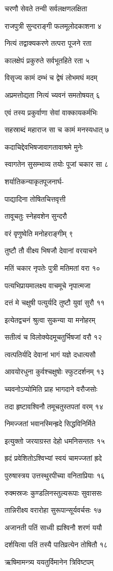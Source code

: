 चरणौ सेवते तन्वी सर्वलक्षणलक्षिता

राजपुत्री सुन्दराङ्गी फलमूलोदकाशना ४

नित्यं तद्वाक्यकरणे तत्परा पूजने रता

कालक्षेपं प्रकुरुते सर्वभूतहिते रता ५

विसृज्य कामं दम्भं च द्वेषं लोभमघं मदम्

अप्रमत्तोद्यता नित्यं च्यवनं समतोषयत् ६

एवं तस्य प्रकुर्वाणा सेवां वाक्कायकर्मभिः

सहस्राब्दं महाराज सा च कामं मनस्यधात् ७

कदाचिद्देवभिषजावागतावाश्रमे मुनेः

स्वागतेन सुसम्भाव्य तयोः पूजां चकार सा ८

शर्यातिकन्याकृतपूजनार्घ-

पाद्यादिना तोषितचित्तवृत्ती

तावूचतुः स्नेहवशेन सुन्दरौ

वरं वृणुष्वेति मनोहराङ्गीम् ९

तुष्टौ तौ वीक्ष्य भिषजौ देवानां वरयाचने

मतिं चकार नृपतेः पुत्री मतिमतां वरा १०

पत्यभिप्रायमालक्ष्य वाचमूचे नृपात्मजा

दत्तं मे चक्षुषी पत्युर्यदि तुष्टौ युवां सुरौ ११

इत्येतद्वचनं श्रुत्वा सुकन्या या मनोहरम्

सतीत्वं च विलोक्येदमूचतुर्भिषजां वरौ १२

त्वत्पतिर्यदि देवानां भागं यज्ञे दधात्यसौ

आवयोरधुना कुर्वश्चक्षुषोः स्फुटदर्शनम् १३

च्यवनोऽप्योमिति प्राह भागदाने वरौजसोः

तदा हृष्टावश्विनौ तमूचतुस्तपतां वरम् १४

निमज्जतां भवानस्मिन्ह्रदे सिद्धविनिर्मिते

इत्युक्तो जरयाग्रस्त देहो धमनिसन्ततः १५

ह्रदं प्रवेशितोऽश्विभ्यां स्वयं चामज्जतां ह्रदे

पुरुषास्त्रय उत्तस्थुरपीच्या वनिताप्रियाः १६

रुक्मस्रजः कुण्डलिनस्तुल्यरूपाः सुवाससः

तान्निरीक्ष्य वरारोहा सुरूपान्सूर्यवर्चसः १७

अजानती पतिं साध्वी ह्यश्विनौ शरणं ययौ

दर्शयित्वा पतिं तस्यै पातिव्रत्येन तोषितौ १८

ऋषिमामन्त्र्य ययतुर्विमानेन त्रिविष्टपम्

